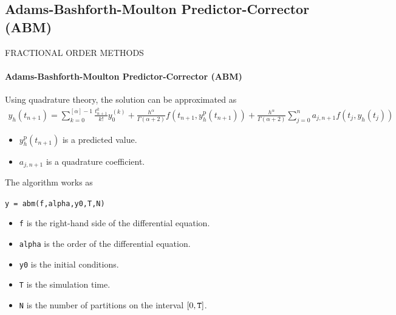 \subsection{Adams-Bashforth-Moulton Predictor-Corrector (ABM)}
\begin{frame}{FRACTIONAL ORDER METHODS}
\framesubtitle{Adams-Bashforth-Moulton Predictor-Corrector (ABM)}
Using quadrature theory, the solution can be approximated as
\begin{equation}
    \begin{aligned} y _ { h } \left( t _ { n + 1 } \right) =  \sum _ { k = 0 } ^ { [ \alpha ] - 1 } \frac { t _ { n + 1 } ^ { k } } { k ! } y _ { 0 } ^ { ( k ) } + \frac { h ^ { \alpha } } { \Gamma ( \alpha + 2 ) } f \left( t _ { n + 1 } , y _ { h } ^ { \mathrm { p } } \left( t _ { n + 1 } \right) \right) + \frac { h ^ { \alpha } } { \Gamma ( \alpha + 2 ) } \sum _ { j = 0 } ^ { n } a _ { j , n + 1 } f \left( t _ { j } , y _ { h } \left( t _ { j } \right) \right) \end{aligned}
\end{equation}
\begin{itemize}
    \item $y _ { h } ^ { \mathrm { p } } \left( t _ { n + 1 } \right)$ is a predicted value.
    \item $a _ { j , n + 1 }$ is a quadrature coefficient.
\end{itemize}
The algorithm works as
\begin{center}
    \texttt{y = abm(f,alpha,y0,T,N)}
\end{center}
\begin{itemize}
    \item \texttt{f} is the right-hand side of the differential equation.
    \item \texttt{alpha} is the order of the differential equation.
    \item \texttt{y0} is the initial conditions.
    \item \texttt{T} is the simulation time.
    \item \texttt{N} is the number of partitions on the interval $[0,\text{\texttt{T}}]$.
\end{itemize}
\end{frame}

